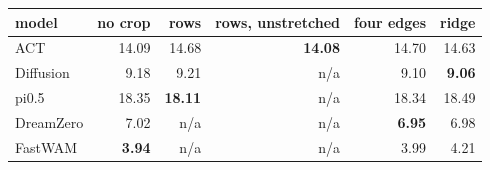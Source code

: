 \begin{tabular}{lrrrrr}
\toprule
model & no crop & rows & rows, unstretched & four edges & ridge \\
\midrule
ACT & 14.09 & 14.68 & \textbf{14.08} & 14.70 & 14.63 \\
Diffusion & 9.18 & 9.21 & n/a & 9.10 & \textbf{9.06} \\
pi0.5 & 18.35 & \textbf{18.11} & n/a & 18.34 & 18.49 \\
DreamZero & 7.02 & n/a & n/a & \textbf{6.95} & 6.98 \\
FastWAM & \textbf{3.94} & n/a & n/a & 3.99 & 4.21 \\
\bottomrule
\end{tabular}
